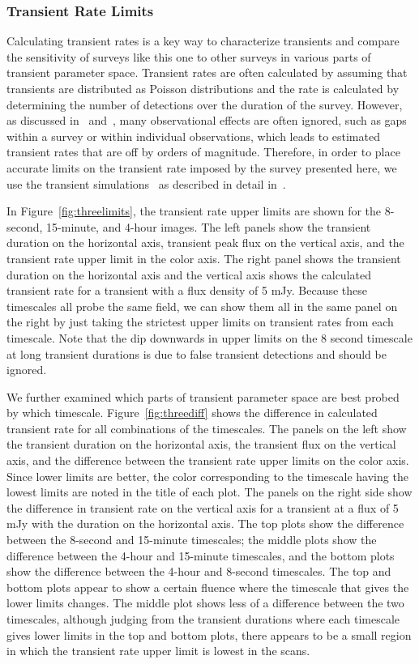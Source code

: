 \documentclass[12pt]{article}
\begin{document}
\subsubsection{Transient Rate Limits}
Calculating transient rates is a key way to characterize transients and compare the sensitivity of surveys like this one to other surveys in various parts of transient parameter space. Transient rates are often calculated by assuming that transients are distributed as Poisson distributions and the rate is calculated by determining the number of detections over the duration of the survey. However, as discussed in~\citet{2017MNRAS.465.4106C} and~\citet{2016MNRAS.459.3161C}, many observational effects are often ignored, such as gaps within a survey or within individual observations, which leads to estimated transient rates that are off by orders of magnitude. Therefore, in order to place accurate limits on the transient rate imposed by the survey presented here, we use the transient simulations~\citep{2022ascl.soft04007C} as described in detail in~\citet{2022A&C....4000629C}. 

In Figure~\ref{fig:threelimits}, the transient rate upper limits are shown for the 8-second, 15-minute, and 4-hour images. The left panels show the transient duration on the horizontal axis, transient peak flux on the vertical axis, and the transient rate upper limit in the color axis. The right panel shows the transient duration on the horizontal axis and the vertical axis shows the calculated transient rate for a transient with a flux density of 5 mJy. Because these timescales all probe the same field, we can show them all in the same panel on the right by just taking the strictest upper limits on transient rates from each timescale. Note that the dip downwards in upper limits on the 8 second timescale at long transient durations is due to false transient detections and should be ignored.

We further examined which parts of transient parameter space are best probed by which timescale. Figure~\ref{fig:threediff} shows the difference in calculated transient rate for all combinations of the timescales. The panels on the left show the transient duration on the horizontal axis, the transient flux on the vertical axis, and the difference between the transient rate upper limits on the color axis. Since lower limits are better, the color corresponding to the timescale having the lowest limits are noted in the title of each plot. The panels on the right side show the difference in transient rate on the vertical axis for a transient at a flux of 5 mJy with the duration on the horizontal axis. The top plots show the difference between the 8-second and 15-minute timescales; the middle plots show the difference between the 4-hour and 15-minute timescales, and the bottom plots show the difference between the 4-hour and 8-second timescales. The top and bottom plots appear to show a certain fluence where the timescale that gives the lower limits changes. The middle plot shows less of a difference between the two timescales, although judging from the transient durations where each timescale gives lower limits in the top and bottom plots, there appears to be a small region in which the transient rate upper limit is lowest in the scans. 
\end{document}
